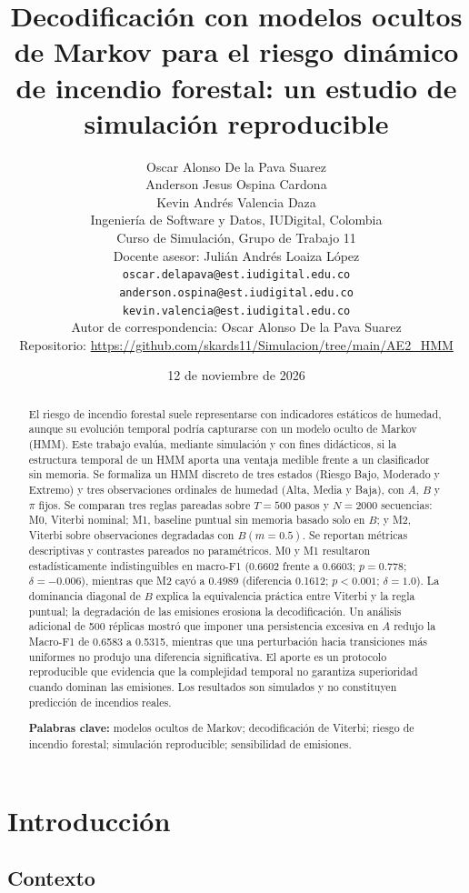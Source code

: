 \documentclass[11pt,letterpaper]{article}
\title{Decodificación con modelos ocultos de Markov para el riesgo dinámico de incendio forestal: un estudio de simulación reproducible}
\author{
Oscar Alonso De la Pava Suarez\\
Anderson Jesus Ospina Cardona\\
Kevin Andrés Valencia Daza\\[0.5em]
\small Ingeniería de Software y Datos, IUDigital, Colombia\\
\small Curso de Simulación, Grupo de Trabajo 11\\
\small Docente asesor: Julián Andrés Loaiza López\\
\small \texttt{oscar.delapava@est.iudigital.edu.co}\\
\small \texttt{anderson.ospina@est.iudigital.edu.co}\\
\small \texttt{kevin.valencia@est.iudigital.edu.co}\\
\small Autor de correspondencia: Oscar Alonso De la Pava Suarez\\
\small Repositorio: \url{https://github.com/skards11/Simulacion/tree/main/AE2_HMM}
}
\date{12 de noviembre de 2026}
\begin{document}
\maketitle

\begin{abstract}
\noindent
El riesgo de incendio forestal suele representarse con indicadores estáticos de humedad, aunque su evolución temporal podría capturarse con un modelo oculto de Markov (HMM). Este trabajo evalúa, mediante simulación y con fines didácticos, si la estructura temporal de un HMM aporta una ventaja medible frente a un clasificador sin memoria. Se formaliza un HMM discreto de tres estados (Riesgo Bajo, Moderado y Extremo) y tres observaciones ordinales de humedad (Alta, Media y Baja), con \(A\), \(B\) y \(\pi\) fijos. Se comparan tres reglas pareadas sobre \(T=500\) pasos y \(N=2000\) secuencias: M0, Viterbi nominal; M1, baseline puntual sin memoria basado solo en \(B\); y M2, Viterbi sobre observaciones degradadas con \(B(m=0.5)\). Se reportan métricas descriptivas y contrastes pareados no paramétricos. M0 y M1 resultaron estadísticamente indistinguibles en macro-F1 (0.6602 frente a 0.6603; \(p=0.778\); \(\delta=-0.006\)), mientras que M2 cayó a 0.4989 (diferencia 0.1612; \(p<0.001\); \(\delta=1.0\)). La dominancia diagonal de \(B\) explica la equivalencia práctica entre Viterbi y la regla puntual; la degradación de las emisiones erosiona la decodificación. Un análisis adicional de 500 réplicas mostró que imponer una persistencia excesiva en \(A\) redujo la Macro-F1 de 0.6583 a 0.5315, mientras que una perturbación hacia transiciones más uniformes no produjo una diferencia significativa. El aporte es un protocolo reproducible que evidencia que la complejidad temporal no garantiza superioridad cuando dominan las emisiones. Los resultados son simulados y no constituyen predicción de incendios reales.

\vspace{0.4em}
\noindent\textbf{Palabras clave:} modelos ocultos de Markov; decodificación de Viterbi; riesgo de incendio forestal; simulación reproducible; sensibilidad de emisiones.
\end{abstract}

\section{Introducción}

\subsection{Contexto}
\end{document}
